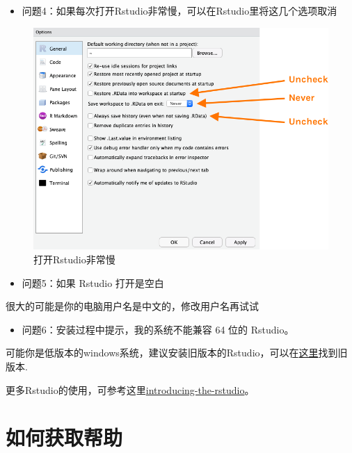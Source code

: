 \documentclass[
]{book}
\providecommand{\tightlist}{%
  \setlength{\itemsep}{0pt}\setlength{\parskip}{0pt}}
\begin{document}
\begin{itemize}
\tightlist
\item
  问题4：如果每次打开Rstudio非常慢，可以在Rstudio里将这几个选项取消
\end{itemize}

\begin{figure}
\centering
\includegraphics{figure/19.png}
\caption{打开Rstudio非常慢}
\end{figure}

\begin{itemize}
\tightlist
\item
  问题5：如果 Rstudio 打开是空白
\end{itemize}

很大的可能是你的电脑用户名是中文的，修改用户名再试试

\begin{itemize}
\tightlist
\item
  问题6：安装过程中提示，我的系统不能兼容 64 位的 Rstudio。
\end{itemize}

可能你是低版本的windows系统，建议安装旧版本的Rstudio，可以在\href{https://rstudio.com/products/rstudio/older-versions/}{这里}找到旧版本.

更多Rstudio的使用，可参考这里\href{https://www.pipinghotdata.com/posts/2020-09-07-introducing-the-rstudio-ide-and-r-markdown/}{introducing-the-rstudio}。

\hypertarget{ux5982ux4f55ux83b7ux53d6ux5e2eux52a9}{%
\section*{如何获取帮助}\label{ux5982ux4f55ux83b7ux53d6ux5e2eux52a9}}
\end{document}

